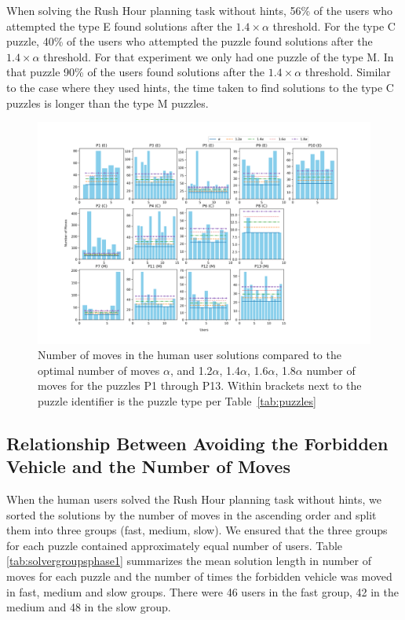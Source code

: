 When solving the Rush Hour planning task without hints, 56\% of the users who attempted the type E found solutions after the $1.4\times\alpha$ threshold.
For the type C puzzle, 40\% of the users who attempted the puzzle found solutions after the $1.4\times\alpha$ threshold.
For that experiment we only had one puzzle of the type M.
In that puzzle 90\% of the users found solutions after the $1.4\times\alpha$ threshold.
Similar to the case where they used hints, the time taken to find solutions to the type C puzzles is longer than the type M puzzles.

\begin{figure}[tpb]
  \centering
  \includegraphics[width=\columnwidth]{img/phase2difficulty.png}
  \caption{Number of moves in the human user solutions compared to the optimal number of moves $\alpha$, and 1.2$\alpha$, 1.4$\alpha$, 1.6$\alpha$, 1.8$\alpha$ number of moves for the puzzles P1 through P13. Within brackets next to the puzzle identifier is the puzzle type per Table~\ref{tab:puzzles}}
  \label{fig:difficulyphase2}
\end{figure}


\subsection{Relationship Between Avoiding the Forbidden Vehicle and the Number of Moves}
\label{sec:relationshipavoidingforbidden}
When the human users solved the Rush Hour planning task without hints, we sorted the solutions by the number of moves in the ascending order and split them into three groups (fast, medium, slow). 
We ensured that the three groups for each puzzle contained approximately equal number of users. 
Table \ref{tab:solvergroupsphase1} summarizes the mean solution length in number of moves for each puzzle and the number of times the forbidden vehicle was moved in fast, medium and slow groups.
There were 46 users in the fast group, 42 in the medium and 48 in the slow group. 

